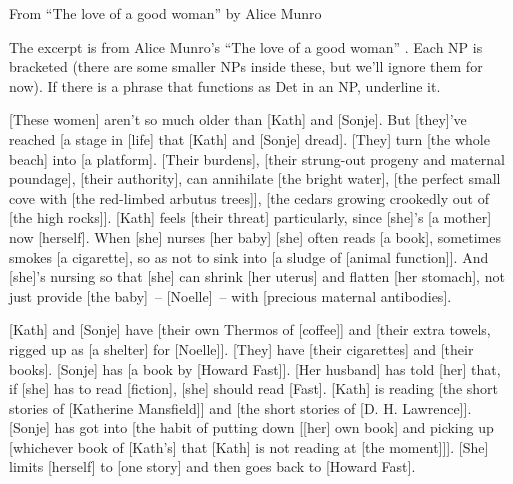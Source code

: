 \begin{tblsframed}{From ``The love of a good woman'' by Alice Munro}

The excerpt is from Alice Munro's \enquote{The love of a good woman} \citep{Munro1998LoveGoodWoman}. Each NP is bracketed (there are some smaller NPs inside these, but we'll ignore them for now). If there is a phrase that functions as Det in an NP, underline it.

\phantom{a}

    [These women] aren't so much older than [Kath] and [Sonje]. But [they]'ve reached [a stage in [life] that [Kath] and [Sonje] dread]. [They] turn [the whole beach] into [a platform]. [Their burdens], [their strung-out progeny and maternal poundage], [their authority], can annihilate [the bright water], [the perfect small cove with [the red-limbed arbutus trees]], [the cedars growing crookedly out of [the high rocks]]. [Kath] feels [their threat] particularly, since [she]'s [a mother] now [herself]. When [she] nurses [her baby] [she] often reads [a book], sometimes smokes [a cigarette], so as not to sink into [a sludge of [animal function]]. And [she]'s nursing so that [she] can shrink [her uterus] and flatten [her stomach], not just provide [the baby]~-- [Noelle]~-- with [precious maternal antibodies].

    \phantom{xxx}[Kath] and [Sonje] have [their own Thermos of [coffee]] and [their extra towels, rigged up as [a shelter] for [Noelle]]. [They] have [their cigarettes] and [their books]. [Sonje] has [a book by [Howard Fast]]. [Her husband] has told [her] that, if [she] has to read [fiction], [she] should read [Fast]. [Kath] is reading [the short stories of [Katherine Mansfield]] and [the short stories of [D. H. Lawrence]]. [Sonje] has got into [the habit of putting down [[her] own book] and picking up [whichever book of [Kath's] that [Kath] is not reading at [the moment]]]. [She] limits [herself] to [one story] and then goes back to [Howard Fast].
\end{tblsframed}

